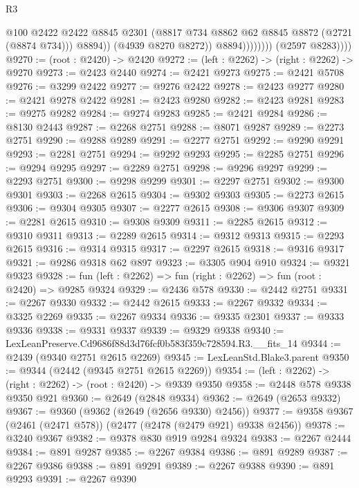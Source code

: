 \begin{lexlean}{R3}
\begin{coremodule}
                                @100
                                @2422
                                @2422
                                @8845
                                @2301
                                (@8817 @734 @8862 @62 @8845 @8872 (@2721 (@8874 @734)))
                                @8894))
                            (@4939 @8270 @8272))
                          @8894))))))))
          (@2597 @8283))))
@9270 := (root : @2420) -> @2420
@9272 := (left : @2262) -> (right : @2262) -> @9270
@9273 := @2423 @2440
@9274 := @2421 @9273
@9275 := @2421 @5708
@9276 := @3299 @2422
@9277 := @9276 @2422
@9278 := @2423 @9277
@9280 := @2421 @9278 @2422
@9281 := @2423 @9280
@9282 := @2423 @9281
@9283 := @9275 @9282
@9284 := @9274 @9283
@9285 := @2421 @9284
@9286 := @8130 @2443
@9287 := @2268 @2751
@9288 := @8071 @9287
@9289 := @2273 @2751
@9290 := @9288 @9289
@9291 := @2277 @2751
@9292 := @9290 @9291
@9293 := @2281 @2751
@9294 := @9292 @9293
@9295 := @2285 @2751
@9296 := @9294 @9295
@9297 := @2289 @2751
@9298 := @9296 @9297
@9299 := @2293 @2751
@9300 := @9298 @9299
@9301 := @2297 @2751
@9302 := @9300 @9301
@9303 := @2268 @2615
@9304 := @9302 @9303
@9305 := @2273 @2615
@9306 := @9304 @9305
@9307 := @2277 @2615
@9308 := @9306 @9307
@9309 := @2281 @2615
@9310 := @9308 @9309
@9311 := @2285 @2615
@9312 := @9310 @9311
@9313 := @2289 @2615
@9314 := @9312 @9313
@9315 := @2293 @2615
@9316 := @9314 @9315
@9317 := @2297 @2615
@9318 := @9316 @9317
@9321 := @9286 @9318 @62 @897
@9323 := @3305 @904 @910
@9324 := @9321 @9323
@9328 := fun (left : @2262) => fun (right : @2262) => fun (root : @2420) => @9285 @9324
@9329 := @2436 @578
@9330 := @2442 @2751
@9331 := @2267 @9330
@9332 := @2442 @2615
@9333 := @2267 @9332
@9334 := @3325 @2269
@9335 := @2267 @9334
@9336 := @9335 @2301
@9337 := @9333 @9336
@9338 := @9331 @9337
@9339 := @9329 @9338
@9340 := LexLeanPreserve.Cd9686f88d3d76fcf0b583f359c728594.R3.__fits_14
@9344 := @2439 (@9340 @2751 @2615 @2269)
@9345 := LexLeanStd.Blake3.parent
@9350 := @9344 (@2442 (@9345 @2751 @2615 @2269))
@9354 := (left : @2262) -> (right : @2262) -> (root : @2420) -> @9339 @9350
@9358 := @2448 @578 @9338 @9350 @921
@9360 := @2649 (@2848 @9334)
@9362 := @2649 (@2653 @9332)
@9367 := @9360 (@9362 (@2649 (@2656 @9330) @2456))
@9377 := @9358 @9367 (@2461 (@2471 @578)) (@2477 (@2478 (@2479 @921) @9338 @2456))
@9378 := @3240 @9367
@9382 := @9378 @830 @919 @9284 @9324
@9383 := @2267 @2444
@9384 := @891 @9287
@9385 := @2267 @9384
@9386 := @891 @9289
@9387 := @2267 @9386
@9388 := @891 @9291
@9389 := @2267 @9388
@9390 := @891 @9293
@9391 := @2267 @9390

\end{coremodule}
\end{lexlean}
